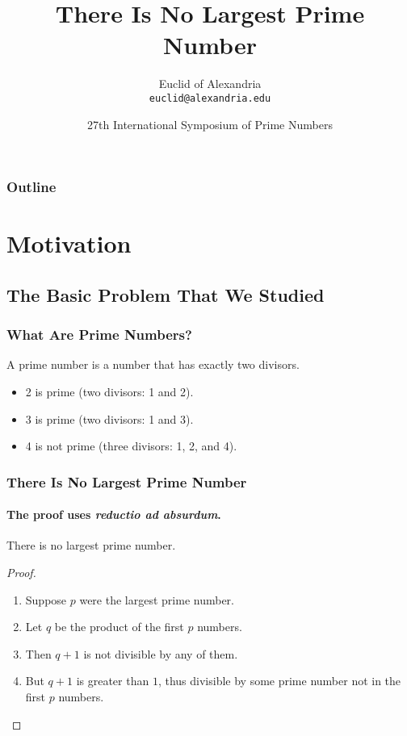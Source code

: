 \documentclass{beamer}
\title{There Is No Largest Prime Number}
\author[Euclid]{Euclid of Alexandria \\ \texttt{euclid@alexandria.edu}}
\date[ISPN '80]{27th International Symposium of Prime Numbers}
\begin{document}
\begin{frame}
	\titlepage
\end{frame}

\begin{frame}
	\frametitle{Outline}
	\tableofcontents[pausesections]
\end{frame}

\section{Motivation}
\subsection{The Basic Problem That We Studied}

\begin{frame}
	\frametitle{What Are Prime Numbers?}
	\begin{definition}
		A \alert{prime number} is a number that has exactly two divisors.
	\end{definition}
	\begin{example}
		\begin{itemize}
			\item 2 is prime (two divisors: 1 and 2).
			      \pause
			\item 3 is prime (two divisors: 1 and 3).
			      \pause
			\item 4 is not prime (\alert{three} divisors: 1, 2, and 4).
		\end{itemize}
	\end{example}
\end{frame}


\begin{frame}
	\frametitle{There Is No Largest Prime Number}
	\framesubtitle{The proof uses \textit{reductio ad absurdum}.}
	\begin{theorem}
		There is no largest prime number.
	\end{theorem}
	\begin{proof}
		\begin{enumerate}
			\item<1-> Suppose $p$ were the largest prime number.
			\item<2-> Let $q$ be the product of the first $p$ numbers.
			\item<3-> Then $q + 1$ is not divisible by any of them.
			\item<1-> But $q + 1$ is greater than $1$, thus divisible by some prime
			number not in the first $p$ numbers.\qedhere
		\end{enumerate}
	\end{proof}
\end{frame}
\end{document}
